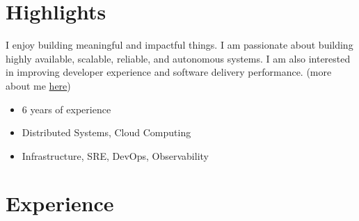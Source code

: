 \documentclass[]{cv-style}                     %
\begin{document}

\section{Highlights}

I enjoy building meaningful and impactful things.
I am passionate about building highly available, scalable, reliable, and autonomous systems.
I am also interested in improving developer experience and software delivery performance.
(more about me \href{https://milad.dev/about}{here})

\begin{itemize}
  \setlength{\itemsep}{-4pt}
  \item 6 years of experience
  \item Distributed Systems, Cloud Computing
  \item Infrastructure, SRE, DevOps, Observability
\end{itemize}



\section{Experience}
\end{document}
